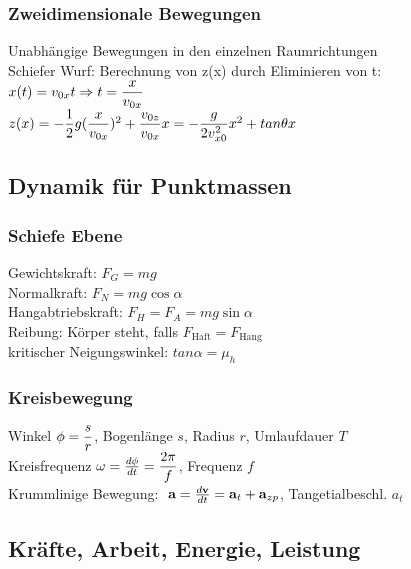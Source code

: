 \documentclass[fs, footer]{latex4ei}
\begin{document}
\begin{multicols*}{4}
\subsubsection{Zweidimensionale Bewegungen}
Unabhängige Bewegungen in den einzelnen Raumrichtungen\\
Schiefer Wurf:
Berechnung von z(x) durch Eliminieren von t: \\$x(t) = v_{0x}t \Rightarrow t = \dfrac{x}{v_{0x}}$\\
$z(x) = -\dfrac{1}{2}g(\dfrac{{x}}{v_{0x}})^2 + \dfrac{v_{0z}}{v_{0x}}x = -\dfrac{g}{2v^2_{x0}}x^2 + tan\theta x$\\
\subsection{Dynamik für Punktmassen}
\subsubsection{Schiefe Ebene}
Gewichtskraft: $F_G = mg$\\
Normalkraft: $F_N = mg\cos \alpha$\\
Hangabtriebskraft: $F_H = F_A = mg\sin \alpha$\\
Reibung: Körper steht, falls $F_{\text{Haft}} = F_{\text{Hang}}$\\
kritischer Neigungswinkel: $tan \alpha = \mu_h$\\
\subsubsection{Kreisbewegung}
Winkel $\phi = \dfrac{s}{r}$, 	Bogenlänge $s$, Radius $r$, Umlaufdauer $T$\\
Kreisfrequenz $\omega = \frac{d\phi}{dt} =\dfrac{2\pi}{f}$,	Frequenz $f$\\
Krummlinige Bewegung: $\ \textbf{a} = \frac{d\textbf{v}}{dt} = \textbf{a}_t + \textbf{a}_{zp}$,	Tangetialbeschl. $a_t$\\

\subsection{Kräfte, Arbeit, Energie, Leistung}

\end{multicols*}
\end{document}
